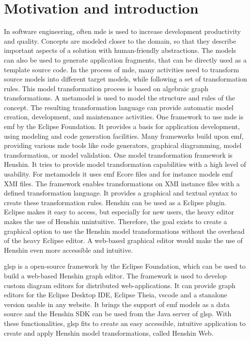\documentclass[conference,onecolumn]{IEEEtran}
\begin{document}
  

  \newpage

  \tableofcontents
  \newpage

  \section{Motivation and introduction}
  \label{sec:motivation}

  In software engineering, often \ac{mde} is used to increase development productivity and quality. \cite{transformations-modeldriven} Concepts are modeled closer to the domain, so that they describe important aspects of a solution with human-friendly abstractions. The models can also be used to generate application fragments, that can be directly used as a template source code. In the process of \ac{mde}, many activities need to transform source models into different target models, while following a set of transformation rules. This model transformation process is based on algebraic graph transformations. A metamodel is used to model the structure and rules of the concept. The resulting transformation language can provide automatic model creation, development, and maintenance activities. \cite{transformations-modeldriven} One framework to use \ac{mde} is \ac{emf} by the Eclipse Foundation. It provides a basis for application development, using modeling and code generation facilities. Many frameworks build upon \ac{emf}, providing various \ac{mde} tools like code generators, graphical diagramming, model transformation, or model validation. \cite{emf} One model transformation framework is Henshin. \cite{henshin-repo} It tries to provide model transformation capabilities with a high level of usability. \cite{henshin-usability} For metamodels it uses \ac{emf} Ecore files and for instance models \ac{emf} XMI files. The framework enables transformations on XMI instance files with a defined transformation language. It provides a graphical and textual syntax to create these transformation rules. \cite{henshin-repo} Henshin can be used as a Eclipse plugin. Eclipse makes it easy to access, but especially for new users, the heavy editor makes the use of Henshin unintuitive.
  Therefore, the goal exists to create a graphical option to use the Henshin model transformations without the overhead of the heavy Eclipse editor. A web-based graphical editor would make the use of Henshin even more accessible and intuitive.

  \ac{glsp} is a open-source framework by the Eclipse Foundation, which can be used to build a web-based Henshin graph editor. The framework is used to develop custom diagram editors for distributed web-applications. \cite{glsp-repo} It can provide graph editors for the Eclipse Desktop IDE, Eclipse Theia, \ac{vscode} and a stanalone version usable in any website. It brings the support of \ac{emf} models as a data source and the Henshin SDK can be used from the Java server of \ac{glsp}. \cite{glsp-doc} With these functionalities, \ac{glsp} fits to create an easy accessible, intuitive application to create and apply Henshin model transformations, called Henshin Web.
\end{document}
